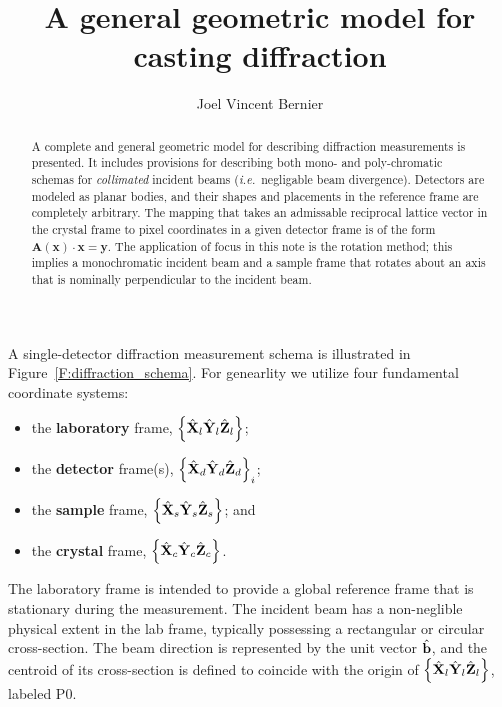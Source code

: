 \documentclass[11pt,letterpaper,final]{amsart}
\author{Joel Vincent Bernier}
\title{A general geometric model for casting diffraction}
\newcommand{\mbm}[1]{\ensuremath{\mbox{\boldmath$#1$}}}
\newcommand{\bhat}{\ensuremath{\hat{\mbm{\mathrm{b}}}}}
\newcommand{\Pzero}{ \ensuremath{\mathrm{P0}}}
\newcommand{\Xl}{\ensuremath{\hat{\mbm{\mathrm{X}}}_l}}
\newcommand{\Yl}{\ensuremath{\hat{\mbm{\mathrm{Y}}}_l}}
\newcommand{\Zl}{\ensuremath{\hat{\mbm{\mathrm{Z}}}_l}}
\newcommand{\labframe}{\ensuremath{\left\{\Xl\Yl\Zl\right\}}}
\newcommand{\Xd}{\ensuremath{\hat{\mbm{\mathrm{X}}}_d}}
\newcommand{\Yd}{\ensuremath{\hat{\mbm{\mathrm{Y}}}_d}}
\newcommand{\Zd}{\ensuremath{\hat{\mbm{\mathrm{Z}}}_d}}
\newcommand{\detframe}{\ensuremath{\left\{\Xd\Yd\Zd\right\}}}
\newcommand{\Xs}{\ensuremath{\hat{\mbm{\mathrm{X}}}_s}}
\newcommand{\Ys}{\ensuremath{\hat{\mbm{\mathrm{Y}}}_s}}
\newcommand{\Zs}{\ensuremath{\hat{\mbm{\mathrm{Z}}}_s}}
\newcommand{\samframe}{\ensuremath{\left\{\Xs\Ys\Zs\right\}}}
\newcommand{\Xc}{\ensuremath{\hat{\mbm{\mathrm{X}}}_c}}
\newcommand{\Yc}{\ensuremath{\hat{\mbm{\mathrm{Y}}}_c}}
\newcommand{\Zc}{\ensuremath{\hat{\mbm{\mathrm{Z}}}_c}}
\newcommand{\xtlframe}{\ensuremath{\left\{\Xc\Yc\Zc\right\}}}
\newcommand{\figref}[1]{Figure~\ref{#1}}
\newcommand{\ie}{{\em i.e.}}
\begin{document}
\maketitle
\begin{abstract}
A complete and general geometric model for describing diffraction
measurements is presented.  It includes provisions for describing both
mono- and poly-chromatic schemas for {\em collimated} incident beams
(\ie\ negligable beam divergence).  Detectors are modeled as planar
bodies, and their shapes and placements in the reference frame are
completely arbitrary.  The mapping that takes an admissable reciprocal
lattice vector in the crystal frame to pixel coordinates in a given
detector frame is of the form $\mathbf{A}(\mathbf{x})\cdot\mathbf{x} =
\mathbf{y}$.  The application of focus in this note is the rotation
method; this implies a monochromatic incident beam and a sample frame
that rotates about an axis that is nominally perpendicular to the
incident beam.
\end{abstract}

A single-detector diffraction measurement schema is illustrated in
\figref{F:diffraction_schema}.  For genearlity we utilize four
fundamental coordinate systems:
\begin{itemize}
  \item the {\bf laboratory} frame, \labframe;
  \item the {\bf detector} frame(s), $\detframe_i$;
  \item the {\bf sample} frame, \samframe; and
  \item the {\bf crystal} frame, \xtlframe.
\end{itemize}

The laboratory frame is intended to provide a global reference frame
that is stationary during the measurement.  The incident beam has a
non-neglible physical extent in the lab frame, typically possessing a
rectangular or circular cross-section.  The beam direction is
represented by the unit vector \bhat, and the centroid of its cross-section is defined to coincide with the origin of
\labframe, labeled \Pzero.
\end{document}
